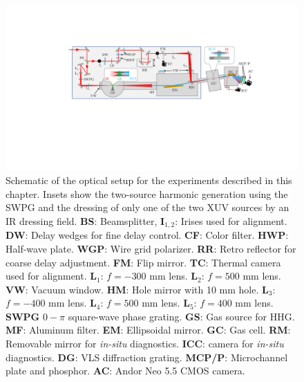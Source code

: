 \begin{figure}
	\centering
	\includegraphics[width=1.0\textwidth]{figures/CATS/beamline_schematic_CATS.pdf}
	\caption[TABLe experimental setup for CATS experiments]{Schematic of the optical setup for the experiments described in this chapter.  Insets show the two-source harmonic generation using the SWPG and the dressing of only one of the two XUV sources by an IR dressing field.  \textbf{BS}: Beamsplitter, \textbf{I$_{1,2}$}: Irises used for alignment. \textbf{DW}: Delay wedges for fine delay control. \textbf{CF}: Color filter. \textbf{HWP}: Half-wave plate. \textbf{WGP}: Wire grid polarizer. \textbf{RR}: Retro reflector for coarse delay adjustment.  \textbf{FM}: Flip mirror. \textbf{TC}: Thermal camera used for alignment.  \textbf{L$_1$}: $f=-300$ mm lens. \textbf{L$_2$}: $f=500$ mm lens. \textbf{VW}: Vacuum window. \textbf{HM}: Hole mirror with 10 mm hole.  \textbf{L$_3$}: $f=-400$ mm lens.  \textbf{L$_4$}: $f=500$ mm lens. \textbf{L$_5$}: $f=400$ mm lens. \textbf{SWPG} $0-\pi$ square-wave phase grating. \textbf{GS}: Gas source for HHG. \textbf{MF}: Aluminum filter. \textbf{EM}: Ellipsoidal mirror. \textbf{GC}: Gas cell. \textbf{RM}: Removable mirror for \textit{in-situ} diagnostics.    \textbf{ICC}: camera for \textit{in-situ} diagnostics. \textbf{DG}: VLS diffraction grating. \textbf{MCP/P}: Microchannel plate and phosphor.  \textbf{AC}: Andor Neo 5.5 CMOS camera.}
	\label{fig:CATS_setup}
\end{figure}


